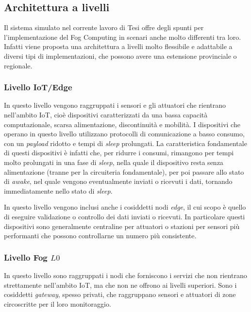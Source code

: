 \subsection{Architettura a livelli}

Il sistema simulato nel corrente lavoro di Tesi offre degli spunti per l'implementazione del Fog Computing in scenari anche molto differenti tra loro. Infatti viene proposta una architettura a livelli molto flessibile e adattabile a diversi tipi di implementazioni, che possono avere una estensione provinciale o regionale.

\subsubsection{Livello IoT/Edge}

In questo livello vengono raggruppati i sensori e gli attuatori che rientrano nell'ambito IoT, cioè dispositivi caratterizzati da una bassa capacità computazionale, scarsa alimentazione, discontinuità e mobilità. I dispositivi che operano in questo livello utilizzano protocolli di comunicazione a basso consumo, con un \textit{payload} ridotto e tempi di \textit{sleep} prolungati. La caratteristica fondamentale di questi dispositivi è infatti che, per ridurre i consumi, rimangono per tempi molto prolungati in una fase di \textit{sleep}, nella quale il dispositivo resta senza alimentazione (tranne per la circuiteria fondamentale), per poi passare allo stato di \textit{awake}, nel quale vengono eventualmente inviati o ricevuti i dati, tornando immediatamente nello stato di \textit{sleep}.

In 	questo livello vengono inclusi anche i cosiddetti nodi \textit{edge}, il cui scopo è quello di eseguire validazione o controllo dei dati inviati o ricevuti. In particolare questi dispositivi sono generalmente centraline per attuatori o stazioni per sensori più performanti che possono controllarne un numero più consistente.

\subsubsection{Livello Fog $L0$}

In questo livello sono raggruppati i nodi che forniscono i servizi che non rientrano strettamente nell'ambito IoT, ma che non ne offrono ai livelli superiori. Sono i cosiddetti \textit{gateway}, spesso privati, che raggruppano sensori e attuatori di zone circoscritte per il loro monitoraggio.

